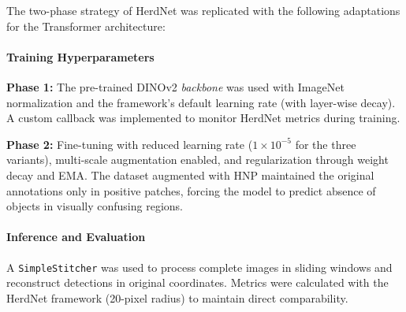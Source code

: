 The two-phase strategy of HerdNet was replicated with the following adaptations for the Transformer architecture:

\paragraph{Training Hyperparameters}

\textbf{Phase 1:} The pre-trained DINOv2 \textit{backbone} was used with ImageNet normalization and the framework's default learning rate (with layer-wise decay). A custom callback was implemented to monitor HerdNet metrics during training.

\textbf{Phase 2:} Fine-tuning with reduced learning rate ($1 \times 10^{-5}$ for the three variants), multi-scale augmentation enabled, and regularization through weight decay and EMA. The dataset augmented with HNP maintained the original annotations only in positive patches, forcing the model to predict absence of objects in visually confusing regions.


\paragraph{Inference and Evaluation}

A \texttt{SimpleStitcher} was used to process complete images in sliding windows and reconstruct detections in original coordinates. Metrics were calculated with the HerdNet framework (20-pixel radius) to maintain direct comparability.

